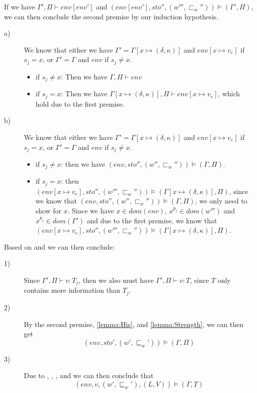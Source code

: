 If we have  $\Gamma',\Pi\vdash env[env']$ and  $(env[env'],sto'',(w''',\sqsubset_w''))\models(\Gamma',\Pi)$, we can then conclude the second premise by our induction hypothesis.
\begin{description}
	\item[a)] We know that either we have $\Gamma'=\Gamma[x\mapsto(\delta,\kappa)]$ and $env[x\mapsto v_e]$ if $s_j=x$, or $\Gamma'=\Gamma$ and $env$ if $s_j\neq x$.
		\begin{itemize}
			\item if $s_j\neq x$: Then we have $\Gamma,\Pi\vdash env$
			\item if $s_j=x$: Then we have $\Gamma[x\mapsto(\delta,\kappa)],\Pi\vdash env[x\mapsto v_e]$, which hold due to the first premise.
		\end{itemize}
	\item[b)] We know that either we have $\Gamma'=\Gamma[x\mapsto(\delta,\kappa)]$ and $env[x\mapsto v_e]$ if $s_j=x$, or $\Gamma'=\Gamma$ and $env$ if $s_j\neq x$.
		\begin{itemize}
			\item if $s_j\neq x$: then we have $(env,sto'',(w'',\sqsubset_w''))\models(\Gamma,\Pi)$.
			\item if $s_j=x$: then $(env[x\mapsto v_e],sto'',(w''',\sqsubset_w''))\models(\Gamma[x\mapsto(\delta,\kappa)],\Pi)$, since we know that $(env,sto'',(w'',\sqsubset_w''))\models(\Gamma,\Pi)$, we only need to show for $x$.
				Since we have $x\in dom(env)$, $x^{p_j}\in dom(w''')$ and $x^{p_j}\in dom(\Gamma')$ and due to the first premise, we know that $(env[x\mapsto v_e],sto'',(w''',\sqsubset_w''))\models(\Gamma[x\mapsto(\delta,\kappa)],\Pi)$.
		\end{itemize}
\end{description}
Based on  and  we can then conclude:

\begin{description}
	\item[1)] Since $\Gamma',\Pi\vdash v:T_j$, then we also must have $\Gamma',\Pi\vdash v:T$, since $T$ only contains more information than $T_j$.
	\item[2)] By the second premise, \cref{lemma:His}, and \cref{lemma:Strength}, we can then get 
		$$(env,sto',(w',\sqsubseteq_w'))\models(\Gamma,\Pi)$$
	\item[3)] Due to , , , and  we can then conclude that
		$$(env,v,(w',\sqsubseteq_w'),(L,V))\models(\Gamma,T)$$
\end{description}
